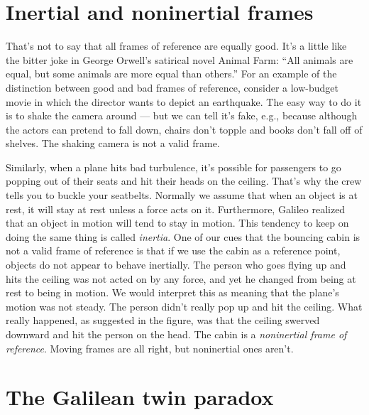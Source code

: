 \vfill\pagebreak

\section{Inertial and noninertial frames}

That's not to say that all frames of reference are equally good. It's a little like the bitter joke
in George Orwell's satirical novel Animal Farm: ``All animals are equal, but some animals are more equal than others.''
For an example of the distinction between good and bad frames of reference, consider a low-budget movie in which
the director wants to depict an earthquake.
The easy way to do it is to shake the camera around --- but we can tell it's fake,
e.g., because although the actors can pretend to fall down, chairs don't topple and books don't fall off of shelves.
The shaking camera is not a valid frame.

\begin{figure}[h]\label{fig:plane-noninertial}
\end{figure}

Similarly, when a plane hits bad turbulence, it's possible for passengers to go popping out of their seats and hit their
heads on the ceiling. That's why the crew tells you to buckle your seatbelts. Normally we assume that when an
object is at rest, it will stay at rest unless a force acts on it. Furthermore, Galileo realized that
an object in motion will tend
to stay in motion. This tendency to keep on doing the same thing is called \emph{inertia}.
One of our cues that the bouncing cabin is not a valid frame of reference is that if we use the cabin as a
reference point, objects do not appear to behave inertially. The person who goes flying up and hits the ceiling
was not acted on by any force, and yet he changed from being at rest to being in motion. We would interpret this
as meaning that the plane's motion was not steady. The person didn't really pop up and hit the ceiling. What really
happened, as suggested in the figure, was that the ceiling swerved downward and hit the person on the head. The cabin is a \emph{noninertial frame
of reference}. Moving frames are all right, but noninertial ones aren't.

\section{The Galilean twin paradox}\label{sec:galilean-twin-paradox}

